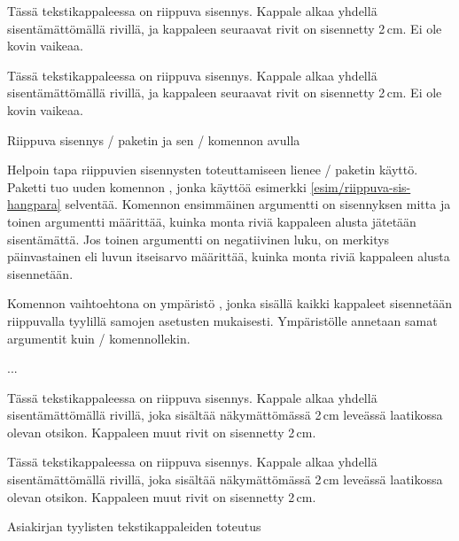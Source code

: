 \begin{esimerkki*}
  \komentoi{,}

\begin{koodilohko}
Tässä tekstikappaleessa on riippuva sisennys. Kappale
alkaa yhdellä sisentämättömällä rivillä, ja kappaleen seuraavat rivit
on sisennetty 2\,cm. Ei ole kovin vaikeaa.
\end{koodilohko}
  \begin{tulos}
    Tässä tekstikappaleessa on riippuva sisennys. Kappale
    alkaa yhdellä sisentämättömällä rivillä, ja kappaleen seuraavat rivit
    on sisennetty 2\,cm. Ei ole kovin vaikeaa.
  \end{tulos}
  \caption{Riippuva sisennys \-/ paketin ja sen
    \-/ komennon avulla}
  \label{esim/riippuva-sis-hangpara}
\end{esimerkki*}

Helpoin tapa riippuvien sisennysten toteuttamiseen lienee
\-/ paketin käyttö. Paketti tuo uuden komennon
, jonka käyttöä esimerkki
\ref{esim/riippuva-sis-hangpara} selventää. Komennon ensimmäinen
argumentti on sisennyksen mitta ja toinen argumentti määrittää, kuinka
monta riviä kappaleen alusta jätetään sisentämättä. Jos toinen
argumentti on negatiivinen luku, on merkitys päinvastainen eli luvun
itseisarvo määrittää, kuinka monta riviä kappaleen alusta sisennetään.

Komennon  vaihtoehtona on ympäristö
, jonka sisällä kaikki kappaleet sisennetään
riippuvalla tyylillä samojen asetusten mukaisesti. Ympäristölle annetaan
samat argumentit kuin \-/ komennollekin.

\begin{koodilohkosis}
\begin{hangparas}{2cm}{1}
  ...
\end{hangparas}
\end{koodilohkosis}

\begin{esimerkki*}
  \komentoi{,}

\begin{koodilohko}
Tässä tekstikappaleessa on
riippuva sisennys. Kappale alkaa yhdellä sisentämättömällä rivillä,
joka sisältää näkymättömässä 2\,cm leveässä laatikossa olevan otsikon.
Kappaleen muut rivit on sisennetty 2\,cm.
\end{koodilohko}
  \begin{tulos}
    Tässä tekstikappaleessa on
    riippuva sisennys. Kappale alkaa yhdellä sisentämättömällä rivillä,
    joka sisältää näkymättömässä 2\,cm leveässä laatikossa olevan otsikon.
    Kappaleen muut rivit on sisennetty 2\,cm.
  \end{tulos}
  \caption{Asiakirjan tyylisten tekstikappaleiden toteutus}
  \label{esim/riippuva-sis-asiakirja}
\end{esimerkki*}

